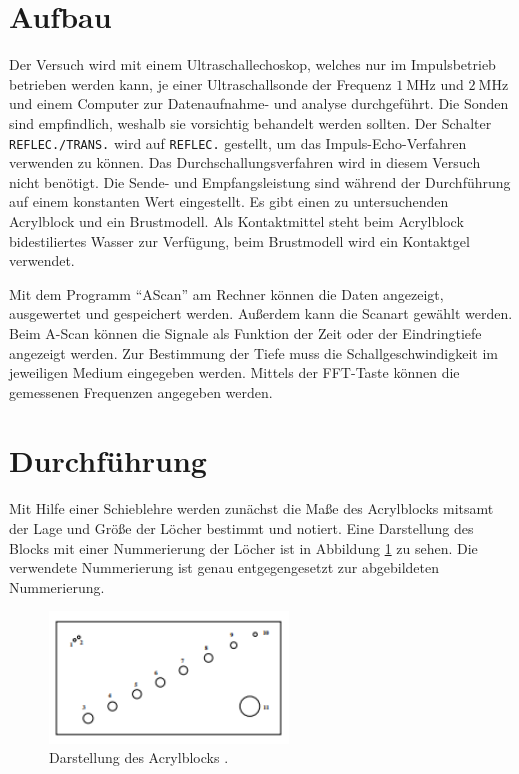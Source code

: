 \section{Aufbau}
Der Versuch wird mit einem Ultraschallechoskop, welches nur im Impulsbetrieb betrieben werden kann, 
je einer Ultraschallsonde der Frequenz $\qty[]{1}{\mega\hertz}$ und $\qty[]{2}{\mega\hertz}$
und einem Computer zur Datenaufnahme- und analyse durchgeführt.
Die Sonden sind empfindlich, weshalb sie vorsichtig behandelt werden sollten.
Der Schalter \texttt{REFLEC./TRANS.} wird auf \texttt{REFLEC.} gestellt, um das Impuls-Echo-Verfahren verwenden zu können.
Das Durchschallungsverfahren wird in diesem Versuch nicht benötigt.
Die Sende- und Empfangsleistung sind während der Durchführung auf einem konstanten Wert eingestellt.
Es gibt einen zu untersuchenden Acrylblock und ein Brustmodell.
Als Kontaktmittel steht beim Acrylblock bidestiliertes Wasser zur Verfügung, beim Brustmodell wird ein Kontaktgel verwendet.



\noindent
Mit dem Programm \enquote{AScan} am Rechner können die Daten angezeigt, ausgewertet und gespeichert werden.
Außerdem kann die Scanart gewählt werden.
Beim A-Scan können die Signale als Funktion der Zeit oder der Eindringtiefe angezeigt werden.
Zur Bestimmung der Tiefe muss die Schallgeschwindigkeit im jeweiligen Medium eingegeben werden.
Mittels der FFT-Taste können die gemessenen Frequenzen angegeben werden.




\section{Durchführung}
Mit Hilfe einer Schieblehre werden zunächst die Maße des Acrylblocks mitsamt der Lage und Größe der Löcher bestimmt und notiert.
Eine Darstellung des Blocks mit einer Nummerierung der Löcher ist in Abbildung \ref{fig:acrylblock} zu sehen.
Die verwendete Nummerierung ist genau entgegengesetzt zur abgebildeten Nummerierung.

\begin{figure}[H]
    \centering
    \includegraphics*[height=3.5cm]{Abbildungen/acrylblock.png}
    \caption{Darstellung des Acrylblocks \cite[]{man:us1}.}
    \label{fig:acrylblock}
\end{figure}

